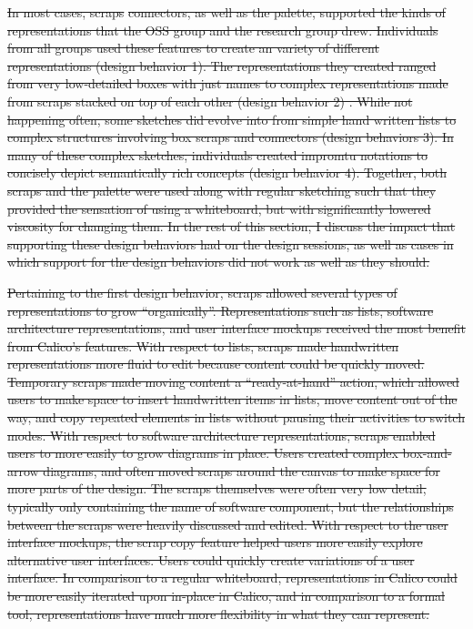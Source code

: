 \documentclass[12pt,fleqn]{ucithesis}
\providecommand{\DIFdeltex}[1]{{\protect\color{red}\sout{#1}}}                      %
\providecommand{\DIFdel}[1]{\texorpdfstring{\DIFdeltex{#1}}{}} %
\begin{document}
\DIFdel{In most cases, scraps }%
\DIFdel{connectors, as well as the palette, supported the kinds of representations that the OSS group and the research group drew. Individuals from all groups used these features to create an variety of different representations (design behavior 1). The representations they created ranged from very low-detailed boxes with just names to complex representations made from scraps stacked on top of each other (design behavior 2) . While not happening often, some sketches did evolve into from simple hand written lists to complex structures involving box scraps and connectors (design behaviors 3). In many of these complex sketches, individuals created impromtu notations to concisely depict semantically rich concepts (design behavior 4). Together, both scraps and the palette were used along with regular sketching such that they provided the sensation of using a whiteboard, but with significantly lowered viscosity for changing them. In the rest of this section, I discuss the impact that supporting these design behaviors had on the design sessions, as well as cases in which support for the design behaviors did not work as well as they should. 
}%

\DIFdel{Pertaining to the first design behavior, scraps allowed several types of representations to grow ``organically''. Representations such as lists, software architecture representations, and user interface mockups received the most benefit from Calico's features. With respect to lists, scraps made handwritten representations more fluid to edit because content could be quickly moved. Temporary scraps made moving content a ``ready-at-hand'' action, which allowed users to make space to insert handwritten items in lists, move content out of the way, and copy repeated elements in lists without pausing their activities to switch modes. With respect to software architecture representations, scraps enabled users to more easily to grow diagrams in place. Users created complex box-and-arrow diagrams, and often moved scraps around the canvas to make space for more parts of the design. The scraps themselves were often very low detail, typically only containing the name of software component, but the relationships between the scraps were heavily discussed and edited. With respect to the user interface mockups, the scrap copy feature helped users more easily explore alternative user interfaces. Users could quickly create variations of a user interface. In comparison to a regular whiteboard, representations in Calico could be more easily iterated upon in-place in Calico, and in comparison to a formal tool, representations have much more flexibility in what they can represent.
}%
\end{document}
